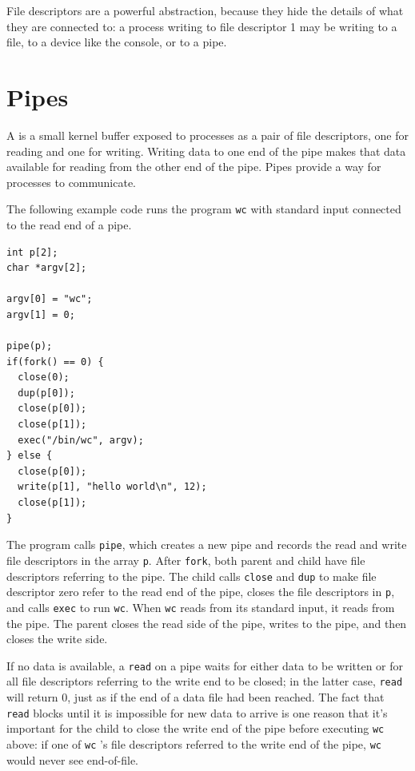File descriptors are a powerful abstraction,
because they hide the details of what they are connected to:
a process writing to file descriptor 1 may be writing to a
file, to a device like the console, or to a pipe.

\section{Pipes}

A
is a small kernel buffer exposed to processes as a pair of
file descriptors, one for reading and one for writing.
Writing data to one end of the pipe
makes that data available for reading from the other end of the pipe.
Pipes provide a way for processes to communicate.

The following example code runs the program
\lstinline{wc}
with standard input connected to
the read end of a pipe.
\begin{lstlisting}[]
int p[2];
char *argv[2];

argv[0] = "wc";
argv[1] = 0;

pipe(p);
if(fork() == 0) {
  close(0);
  dup(p[0]);
  close(p[0]);
  close(p[1]);
  exec("/bin/wc", argv);
} else {
  close(p[0]);
  write(p[1], "hello world\n", 12);
  close(p[1]);
}
\end{lstlisting}
The program calls
\lstinline{pipe},
which creates a new pipe and records the read and write
file descriptors in the array
\lstinline{p}.
After
\lstinline{fork},
both parent and child have file descriptors referring to the pipe.
The child calls \lstinline{close} and \lstinline{dup} to make file descriptor
zero refer to the read end of the pipe,
closes the file descriptors in
\lstinline{p},
and calls \lstinline{exec} to run
\lstinline{wc}.
When
\lstinline{wc}
reads from its standard input, it reads from the pipe.
The parent closes the read side of the pipe,
writes to the pipe,
and then closes the write side.

If no data is available, a
\lstinline{read}
on a pipe waits for either data to be written or for all
file descriptors referring to the write end to be closed;
in the latter case,
\lstinline{read}
will return 0, just as if the end of a data file had been reached.
The fact that
\lstinline{read}
blocks until it is impossible for new data to arrive
is one reason that it's important for the child to
close the write end of the pipe
before executing
\lstinline{wc}
above: if one of
\lstinline{wc} 's
file descriptors referred to the write end of the pipe,
\lstinline{wc}
would never see end-of-file.


